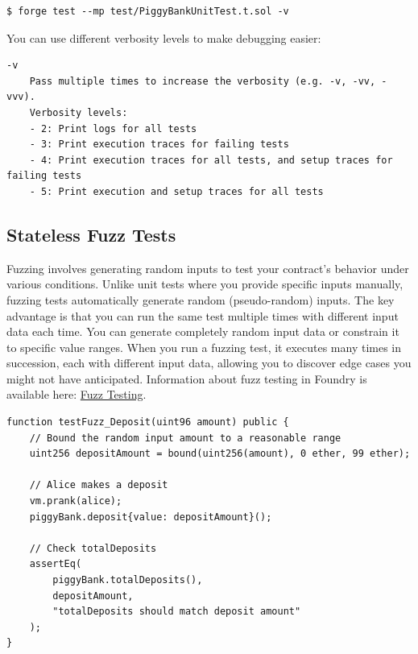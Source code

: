 \documentclass[12pt]{article}
\begin{document}
\noindent \begin{minipage}{\textwidth}
    \begin{verbatim}
$ forge test --mp test/PiggyBankUnitTest.t.sol -v
\end{verbatim}
\end{minipage}

\noindent
You can use different verbosity levels to make debugging easier:

\noindent \begin{minipage}{\textwidth}
    \begin{verbatim}
-v
    Pass multiple times to increase the verbosity (e.g. -v, -vv, -vvv).
    Verbosity levels:
    - 2: Print logs for all tests
    - 3: Print execution traces for failing tests
    - 4: Print execution traces for all tests, and setup traces for failing tests
    - 5: Print execution and setup traces for all tests
\end{verbatim}
\end{minipage}

\subsection{Stateless Fuzz Tests}
Fuzzing involves generating random inputs to test your contract's behavior
under various conditions. Unlike unit tests where you provide specific inputs
manually, fuzzing tests automatically generate random (pseudo-random) inputs.
The key advantage is that you can run the same test multiple times with
different input data each time. You can generate completely random input data
or constrain it to specific value ranges. When you run a fuzzing test, it
executes many times in succession, each with different input data, allowing you
to discover edge cases you might not have anticipated. Information about fuzz
testing in Foundry is available here:
\href{https://book.getfoundry.sh/forge/fuzz-testing}{Fuzz Testing}.

\noindent \begin{minipage}{\textwidth}
    \begin{lstlisting}[language=Solidity]
function testFuzz_Deposit(uint96 amount) public {
    // Bound the random input amount to a reasonable range
    uint256 depositAmount = bound(uint256(amount), 0 ether, 99 ether);
    
    // Alice makes a deposit
    vm.prank(alice);
    piggyBank.deposit{value: depositAmount}();
    
    // Check totalDeposits
    assertEq(
        piggyBank.totalDeposits(),
        depositAmount,
        "totalDeposits should match deposit amount"
    );
}
\end{lstlisting}
\end{minipage}
\end{document}
